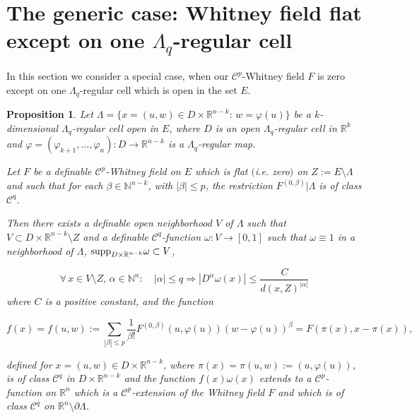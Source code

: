 \documentclass[12pt]{amsart}
\newtheorem{prop}[thm]{Proposition}
\theoremstyle{definition}
\theoremstyle{remark}
\numberwithin{equation}{section}
\newcommand{\Real}{\mathbb R}
\begin{document}
\medskip
\section{The generic case: Whitney field flat except on one $\varLambda_q$-regular cell}

\bigskip
In this section we consider a special case, when our $\mathcal{C}^p$-Whitney field $F$ is zero except on one $\varLambda_q$-regular cell which is open in the set $E$.

\begin{prop} Let $\varLambda =\{x = (u,w)\in D\times \Real^{n-k}: \, w=\varphi(u)\}$ be a $k$-dimensional $\varLambda_q$-regular cell open in $E$, where $D$ is an open ${\varLambda}_q$-regular cell in $\Real^k$ and $\varphi=(\varphi_{k+1},\dots,\varphi_n): D\longrightarrow \Real^{n-k}$ is a $\varLambda_q$-regular map.

Let $F$ be a definable $\mathcal{C}^p$-Whitney field on $E$ which is flat $($i.e. zero$)$ on $Z:= E\setminus \varLambda$ and such that for each $\beta\in \mathbb{N}^{n-k}$, with $|\beta|\leq p$,  the restriction $F^{(0,\beta)}|\varLambda$ is of class $\mathcal{C}^q$.

\medskip
Then there exists a definable open neighborhood $V$ of $\varLambda$ such that \newline $V\subset D\times \Real^{n-k}\setminus Z$ and a definable $\mathcal{C}^q$-function $\omega: V\longrightarrow [0, 1]$ such that
$\omega\equiv 1$ in a neighborhood of $\varLambda$, ${\rm supp}_{D\times \Real^{n-k}}\omega\subset V$,

$$
\forall \, x\in V\setminus Z, \, \alpha\in \mathbb{N}^n: \quad |\alpha|\leq q \Longrightarrow |D^\alpha \omega(x)|\leq \frac{C}{d(x, Z)^{|\alpha|}}
$$
where $C$ is a positive constant, and the function

$$
f(x)=f(u, w):= \sum_{|\beta|\leq p}\frac{1}{\beta!}F^{(0,\beta)}(u,\varphi(u))(w - \varphi(u))^{\beta} = F(\pi(x), x- \pi(x)),
$$

\noindent
defined for $x=(u, w)\in D\times \Real^{n-k}$, where $\pi(x)= \pi(u, w):= (u, \varphi(u))$,  is of class $\mathcal{C}^q$ in $D\times \Real^{n-k}$ and the function $f(x)\omega(x)$ extends to a $\mathcal{C}^p$-function on $\Real^n$ which is a $\mathcal{C}^p$-extension of the Whitney field $F$ and which is of class $\mathcal{C}^q$ on $\Real^n\setminus \partial\varLambda$.
\end{prop}
\end{document}
